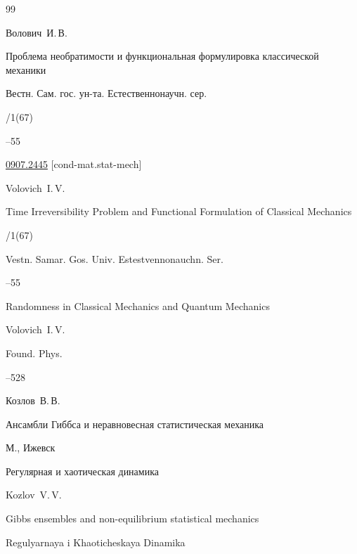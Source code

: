 \begin{thebibliography}{99}




\by Волович~И.\,В.

\paper Проблема необратимости и функциональная формулировка классической механики 

\jour Вестн. Сам. гос. ун-та. Естественнонаучн. сер.


/1(67)

--55

\arxiv \href{http://arxiv.org/abs/0907.2445}{0907.2445} [cond-mat.stat-mech]

\misctransl

\by Volovich~I.\,V.

\paper Time Irreversibility Prob\-lem and Functional Formulation of Classical Mechanics


/1(67)

\jour Vestn. Samar. Gos. Univ. Estest\-venno\-nauchn. Ser.

--55




\paper Randomness in Classical Mechanics and Quantum Mechanics

\by Volovich~I.\,V.

\jour Found. Phys.




--528




\by Козлов~В.\,В.

\book Ансамбли Гиббса и неравновесная статистическая механика

\publaddr М., Ижевск

\publ Регулярная и хаотическая динамика



\misctransl

\by Kozlov~V.\,V. 

\book Gibbs ensembles and non-equilibrium statistical mechanics

\publ Regulyarnaya i Khaoticheskaya Dinamika


\end{thebibliography}
